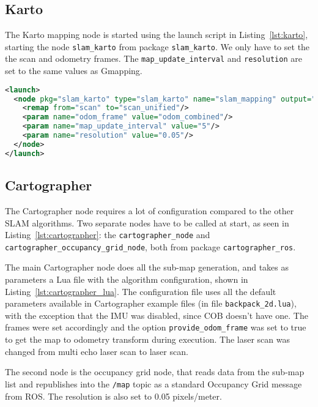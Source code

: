 \subsection{Karto}

The Karto mapping node is started using the launch script in Listing~\ref{lst:karto}, starting the node \texttt{slam\_karto} from package \texttt{slam\_karto}. We only have to set the the scan and odometry frames. The \texttt{map\_update\_interval} and \texttt{resolution} are set to the same values as Gmapping.

\begin{lstlisting}[caption={Karto launch file.},label={lst:karto},language=XML]
<launch>
  <node pkg="slam_karto" type="slam_karto" name="slam_mapping" output="screen">
    <remap from="scan" to="scan_unified"/>
    <param name="odom_frame" value="odom_combined"/>
    <param name="map_update_interval" value="5"/>
    <param name="resolution" value="0.05"/>
  </node>
</launch>
\end{lstlisting}

\subsection{Cartographer}

The Cartographer node requires a lot of configuration compared to the other SLAM algorithms. Two separate nodes have to be called at start, as seen in Listing~\ref{lst:cartographer}: the \texttt{cartographer\_node} and \texttt{cartographer\_occupancy\_grid\_node}, both from package \texttt{cartographer\_ros}.

The main Cartographer node does all the sub-map generation, and takes as parameters a Lua file with the algorithm configuration, shown in Listing~\ref{lst:cartographer_lua}. The configuration file uses all the default parameters available in Cartographer example files (in file \texttt{backpack\_2d.lua}), with the exception that the IMU was disabled, since COB doesn't have one. The frames were set accordingly and the option \texttt{provide\_odom\_frame} was set to true to get the map to odometry transform during execution. The laser scan was changed from multi echo laser scan to laser scan.

The second node is the occupancy grid node, that reads data from the sub-map list and republishes into the \texttt{/map} topic as a standard Occupancy Grid message from ROS. The resolution is also set to 0.05 pixels/meter.

